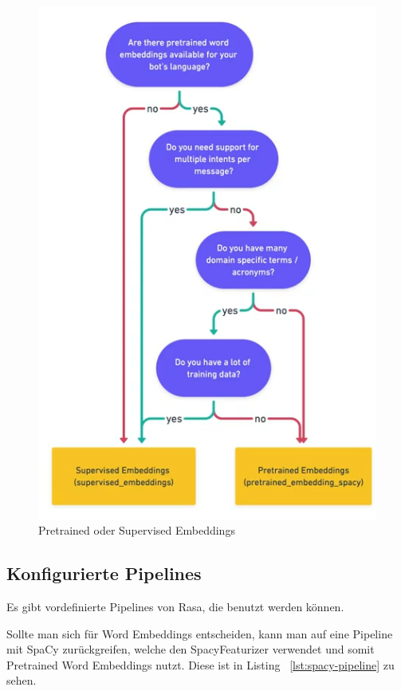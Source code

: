 \begin{figure}[hbt!]
    \centering
    \includegraphics[scale=0.7]{pics/pre-trained-vs-supervised}
    \caption{Pretrained oder Supervised Embeddings~\cite{pretrainedVsSupervised, rasaMasterclassPreConfiguredPipelines}}
    \label{fig:pre_trained_vs_supervised}
\end{figure}

\subsection{Konfigurierte Pipelines}\label{subsec:configured-pipelines}

Es gibt vordefinierte Pipelines von Rasa, die benutzt werden können.

Sollte man sich für Word Embeddings entscheiden, kann man auf eine Pipeline mit SpaCy zurückgreifen, welche den SpacyFeaturizer verwendet und somit Pretrained Word Embeddings nutzt.
Diese ist in Listing ~\ref{lst:spacy-pipeline} zu sehen.\cite{startingPipelines, allComponents}

